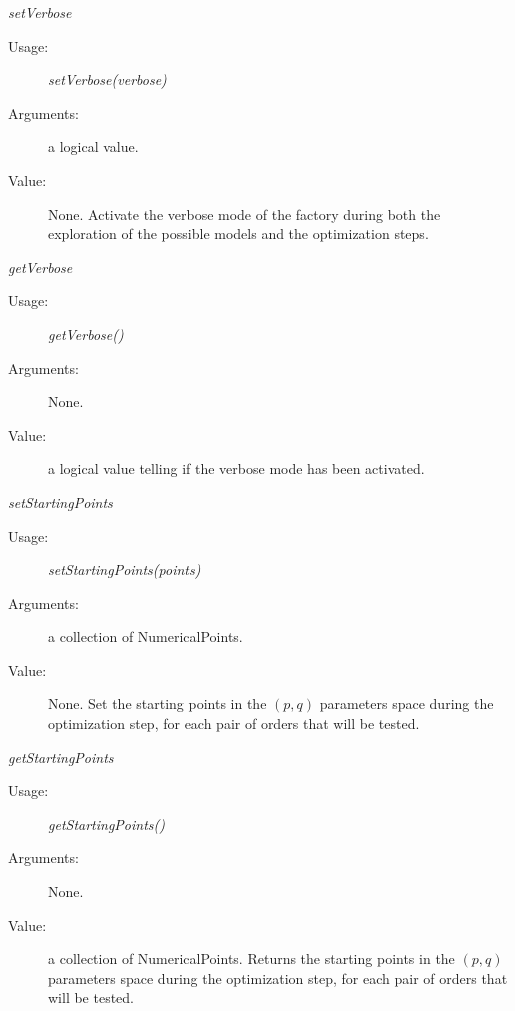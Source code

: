 \begin{description}
\begin{description}
\item \textit{setVerbose}
\begin{description}
\item[Usage:] \textit{setVerbose(verbose)}
\item[Arguments:] a logical value.
\item[Value:] None. Activate the verbose mode of the factory during both the exploration of the possible models and the optimization steps.
\end{description}
\bigskip

\item \textit{getVerbose}
\begin{description}
\item[Usage:] \textit{getVerbose()}
\item[Arguments:] None.
\item[Value:] a logical value telling if the verbose mode has been activated.
\end{description}
\bigskip

\item \textit{setStartingPoints}
\begin{description}
\item[Usage:] \textit{setStartingPoints(points)}
\item[Arguments:] a collection of NumericalPoints.
\item[Value:] None. Set the starting points in the $(p, q)$ parameters space during the optimization step, for each pair of orders that will be tested.
\end{description}
\bigskip

\item \textit{getStartingPoints}
\begin{description}
\item[Usage:] \textit{getStartingPoints()}
\item[Arguments:] None.
\item[Value:] a collection of NumericalPoints. Returns the starting points in the $(p, q)$ parameters space during the optimization step, for each pair of orders that will be tested.
\end{description}
\bigskip

\end{description}

\end{description}

\newpage
